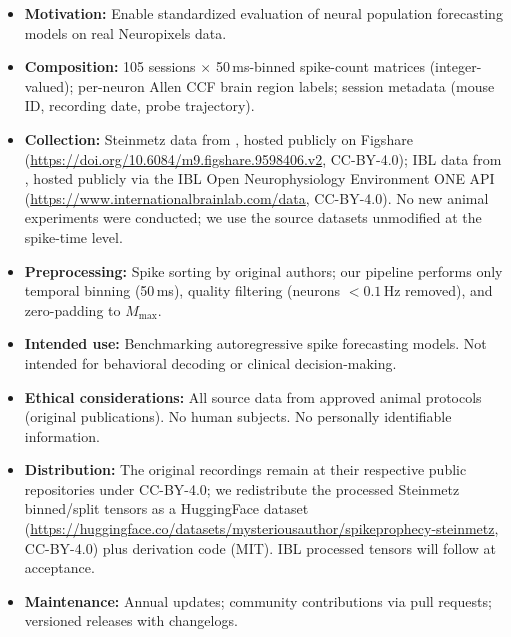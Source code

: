 \documentclass{article}
\begin{document}
\begin{itemize}[nosep, leftmargin=*]
  \item \textbf{Motivation:} Enable standardized evaluation of neural
    population forecasting models on real Neuropixels data.
  \item \textbf{Composition:} 105 sessions $\times$
    50\,ms-binned spike-count matrices (integer-valued); per-neuron
    Allen CCF brain region labels; session metadata (mouse ID,
    recording date, probe trajectory).
  \item \textbf{Collection:} Steinmetz data from
    \citet{steinmetz2019distributed}, hosted publicly on Figshare
    (\url{https://doi.org/10.6084/m9.figshare.9598406.v2},
    CC-BY-4.0); IBL data from \citet{ibl2023brainwide}, hosted
    publicly via the IBL Open Neurophysiology Environment ONE API
    (\url{https://www.internationalbrainlab.com/data}, CC-BY-4.0).
    No new animal experiments were conducted; we use the source
    datasets unmodified at the spike-time level.
  \item \textbf{Preprocessing:} Spike sorting by original authors;
    our pipeline performs only temporal binning (50\,ms), quality
    filtering (neurons $< 0.1$\,Hz removed), and zero-padding to
    $M_\mathrm{max}$.
  \item \textbf{Intended use:} Benchmarking autoregressive spike
    forecasting models.  Not intended for behavioral decoding
    or clinical decision-making.
  \item \textbf{Ethical considerations:} All source data from
    approved animal protocols (original publications).  No human
    subjects.  No personally identifiable information.
  \item \textbf{Distribution:} The original recordings remain at
    their respective public repositories under CC-BY-4.0; we
    redistribute the processed Steinmetz binned/split tensors as
    a HuggingFace dataset
    (\url{https://huggingface.co/datasets/mysteriousauthor/spikeprophecy-steinmetz},
    CC-BY-4.0) plus derivation code (MIT).  IBL processed tensors
    will follow at acceptance.
  \item \textbf{Maintenance:} Annual updates; community contributions
    via pull requests; versioned releases with changelogs.
\end{itemize}


\newpage

\end{document}
